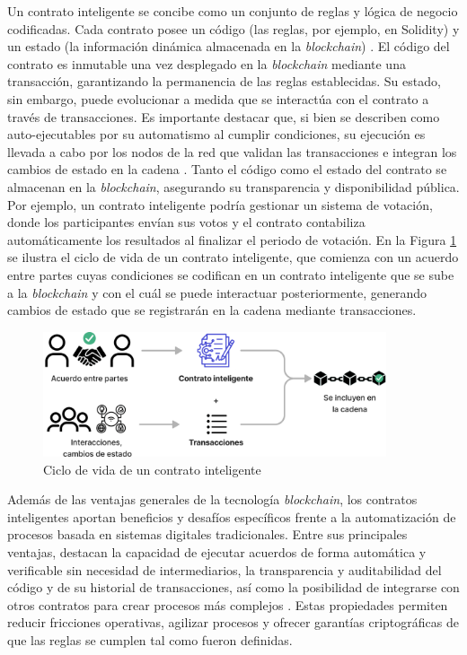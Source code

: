 Un contrato inteligente se concibe como un conjunto de reglas y lógica de negocio codificadas. Cada contrato posee un código (las reglas, por ejemplo, en Solidity) y un estado (la información dinámica almacenada en la \textit{blockchain}) \cite{buterin2013ethereum}. El código del contrato es inmutable una vez desplegado en la \textit{blockchain} mediante una transacción, garantizando la permanencia de las reglas establecidas. Su estado, sin embargo, puede evolucionar a medida que se interactúa con el contrato a través de transacciones. Es importante destacar que, si bien se describen como auto-ejecutables por su automatismo al cumplir condiciones, su ejecución es llevada a cabo por los \glspl{nodo} de la red que validan las transacciones e integran los cambios de estado en la cadena \cite{buterin2013ethereum}. Tanto el código como el estado del contrato se almacenan en la \textit{blockchain}, asegurando su transparencia y disponibilidad pública. Por ejemplo, un contrato inteligente podría gestionar un sistema de votación, donde los participantes envían sus votos y el contrato contabiliza automáticamente los resultados al finalizar el periodo de votación. En la Figura \ref{fig:smart-contract-process} se ilustra el ciclo de vida de un contrato inteligente, que comienza con un acuerdo entre partes cuyas condiciones se codifican en un contrato inteligente que se sube a la \textit{blockchain} y con el cuál se puede interactuar posteriormente, generando cambios de estado que se registrarán en la cadena mediante transacciones.

\begin{figure}[!tb]
    \centering
    \includegraphics[width=0.9\textwidth]{Figures/smart-contract-process.png}
    \caption{Ciclo de vida de un contrato inteligente}
    \label{fig:smart-contract-process}
\end{figure}

Además de las ventajas generales de la tecnología \textit{blockchain}, los contratos inteligentes aportan beneficios y desafíos específicos frente a la automatización de procesos basada en sistemas digitales tradicionales. Entre sus principales ventajas, destacan la capacidad de ejecutar acuerdos de forma automática y verificable sin necesidad de intermediarios, la transparencia y auditabilidad del código y de su historial de transacciones, así como la posibilidad de integrarse con otros contratos para crear procesos más complejos \cite{bartolomeo2020introduccion}. Estas propiedades permiten reducir fricciones operativas, agilizar procesos y ofrecer garantías criptográficas de que las reglas se cumplen tal como fueron definidas.

